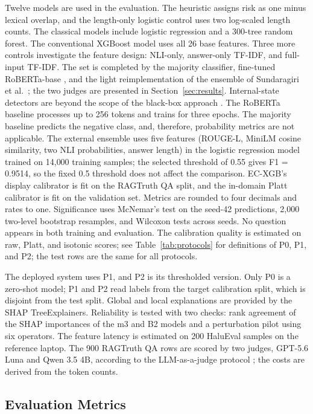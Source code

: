 \documentclass[a4paper,fleqn]{cas-sc}
\begin{document}
Twelve models are used in the evaluation. The heuristic assigns risk as one minus lexical overlap, and the length-only logistic control uses two log-scaled length counts. The classical models include logistic regression and a 300-tree random forest. The conventional XGBoost model \cite{xgboost} uses all 26 base features. Three more controls investigate the feature design: NLI-only, answer-only TF-IDF, and full-input TF-IDF. The set is completed by the majority classifier, fine-tuned RoBERTa-base \cite{liu2019roberta}, and the light reimplementation of the ensemble of Sundaragiri et al.\ \cite{ijert}; the two judges are presented in Section~\ref{sec:results}. Internal-state detectors are beyond the scope of the black-box approach \cite{inside2024}. The RoBERTa baseline processes up to 256 tokens and trains for three epochs. The majority baseline predicts the negative class, and, therefore, probability metrics are not applicable. The external ensemble uses five features (ROUGE-L, MiniLM cosine similarity, two NLI probabilities, answer length) in the logistic regression model trained on 14{,}000 training samples; the selected threshold of 0.55 gives F1 = 0.9514, so the fixed 0.5 threshold does not affect the comparison. EC-XGB's display calibrator is fit on the RAGTruth QA split, and the in-domain Platt calibrator is fit on the validation set. Metrics are rounded to four decimals and rates to one. Significance uses McNemar's test on the seed-42 predictions, 2,000 two-level bootstrap resamples, and Wilcoxon tests across seeds. No question appears in both training and evaluation. The calibration quality is estimated on raw, Platt, and isotonic scores; see Table~\ref{tab:protocols} for definitions of P0, P1, and P2; the test rows are the same for all protocols.


The deployed system uses P1, and P2 is its thresholded version. Only P0 is a zero-shot model; P1 and P2 read labels from the target calibration split, which is disjoint from the test split. Global and local explanations are provided by the SHAP \cite{shap} TreeExplainers. Reliability is tested with two checks: rank agreement of the SHAP importances of the m3 and B2 models and a perturbation pilot using six operators. The feature latency is estimated on 200 HaluEval samples on the reference laptop. The 900 RAGTruth QA rows are scored by two judges, GPT-5.6 Luna and Qwen 3.5 4B, according to the LLM-as-a-judge protocol \cite{zheng2023judge}; the costs are derived from the token counts.

\subsection{Evaluation Metrics}
\end{document}
